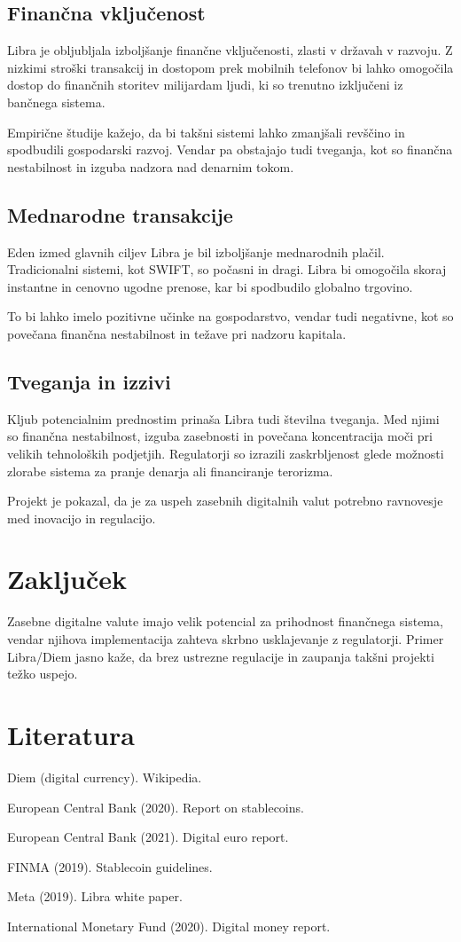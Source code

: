 \documentclass[12pt,a4paper]{article}
\begin{document}
\subsection{Finančna vključenost}
Libra je obljubljala izboljšanje finančne vključenosti, zlasti v državah v razvoju. Z nizkimi stroški transakcij in dostopom prek mobilnih telefonov bi lahko omogočila dostop do finančnih storitev milijardam ljudi, ki so trenutno izključeni iz bančnega sistema.

Empirične študije kažejo, da bi takšni sistemi lahko zmanjšali revščino in spodbudili gospodarski razvoj. Vendar pa obstajajo tudi tveganja, kot so finančna nestabilnost in izguba nadzora nad denarnim tokom.

\subsection{Mednarodne transakcije}
Eden izmed glavnih ciljev Libra je bil izboljšanje mednarodnih plačil. Tradicionalni sistemi, kot SWIFT, so počasni in dragi. Libra bi omogočila skoraj instantne in cenovno ugodne prenose, kar bi spodbudilo globalno trgovino.

To bi lahko imelo pozitivne učinke na gospodarstvo, vendar tudi negativne, kot so povečana finančna nestabilnost in težave pri nadzoru kapitala.

\subsection{Tveganja in izzivi}
Kljub potencialnim prednostim prinaša Libra tudi številna tveganja. Med njimi so finančna nestabilnost, izguba zasebnosti in povečana koncentracija moči pri velikih tehnoloških podjetjih. Regulatorji so izrazili zaskrbljenost glede možnosti zlorabe sistema za pranje denarja ali financiranje terorizma.

Projekt je pokazal, da je za uspeh zasebnih digitalnih valut potrebno ravnovesje med inovacijo in regulacijo.

\section{Zaključek}

Zasebne digitalne valute imajo velik potencial za prihodnost finančnega sistema, vendar njihova implementacija zahteva skrbno usklajevanje z regulatorji. Primer Libra/Diem jasno kaže, da brez ustrezne regulacije in zaupanja takšni projekti težko uspejo.

\section{Literatura}

Diem (digital currency). Wikipedia.

European Central Bank (2020). Report on stablecoins.

European Central Bank (2021). Digital euro report.

FINMA (2019). Stablecoin guidelines.

Meta (2019). Libra white paper.

International Monetary Fund (2020). Digital money report.
\end{document}

